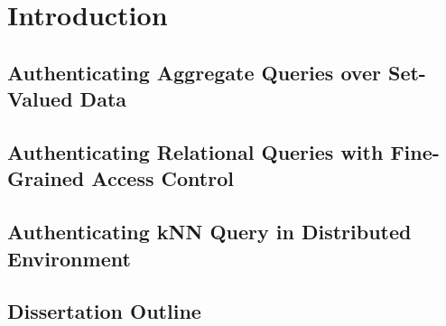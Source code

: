 \chapter{Introduction}\label{chap:intro}

\section{Authenticating Aggregate Queries over Set-Valued Data}

\section{Authenticating Relational Queries with Fine-Grained Access Control}

\section{Authenticating kNN Query in Distributed Environment}

\section{Dissertation Outline}

